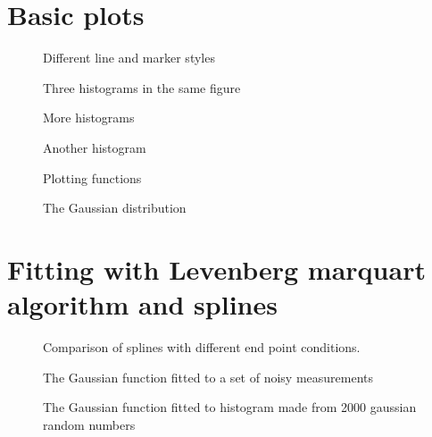 \documentclass{article}
\begin{document}
\section{Basic plots}
\label{sec:basic}

\begin{figure}[H]
  \centering
  
  \caption{Different line and marker styles}
\end{figure}

\begin{figure}[H]
  \centering
  
  \caption{Three histograms in the same figure}
\end{figure}

\begin{figure}[H]
  \centering
  
  
  
  \caption{More histograms}
\end{figure}

\begin{figure}[H]
  \centering
  
  \caption{Another histogram}
\end{figure}

\begin{figure}[H]
  \centering
  
  \caption{Plotting functions}
\end{figure}

\begin{figure}[H]
  \centering
  
  \caption{The Gaussian distribution}
\end{figure}

\section{Fitting with Levenberg marquart algorithm and splines}
\label{sec:LMA}

\begin{figure}[H]
  \centering
  
  \caption{Comparison of splines with different end point conditions.}
\end{figure}

\begin{figure}[H]
  \centering
  
  \caption{The Gaussian function fitted to a set of noisy measurements}
\end{figure}

\begin{figure}[H]
  \centering
  
  \caption{The Gaussian function fitted to histogram made from 2000 gaussian random numbers}
\end{figure}
\end{document}
